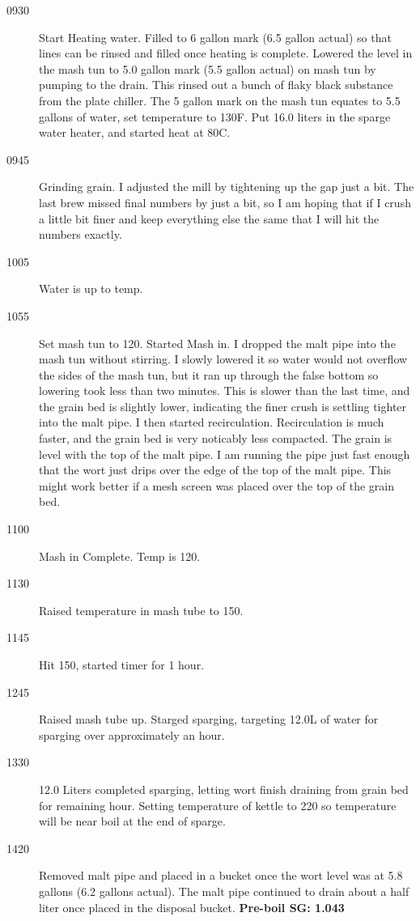 \begin{description}
    \item[0930] Start Heating water.  Filled to 6 gallon mark (6.5 gallon actual) so that lines can be rinsed and filled once heating is complete. Lowered the level in the mash tun to 5.0 gallon mark (5.5 gallon actual) on mash tun by pumping to the drain.  This rinsed out a bunch of flaky black substance from the plate chiller.  The 5 gallon mark on the mash tun equates to 5.5 gallons of water, set temperature to 130F.  Put 16.0 liters in the sparge water heater, and started heat at 80C.  
    \item[0945] Grinding grain.  I adjusted the mill by tightening up the gap just a bit.  The last brew missed final numbers by just a bit, so I am hoping that if I crush a little bit finer and keep everything else the same that I will hit the numbers exactly.
    \item[1005] Water is up to temp.
    \item[1055] Set mash tun to 120. Started Mash in.  I dropped the malt pipe into the mash tun without stirring.  I slowly lowered it so water would not overflow the sides of the mash tun, but it ran up through the false bottom so lowering took less than two minutes.  This is slower than the last time, and the grain bed is slightly lower, indicating the finer crush is settling tighter into the malt pipe.  I then started recirculation.  Recirculation is much faster, and the grain bed is very noticably less compacted.  The grain is level with the top of the malt pipe.  I am running the pipe just fast enough that the wort just drips over the edge of the top of the malt pipe.  This might work better if a mesh screen was placed over the top of the grain bed.
    \item[1100] Mash in Complete. Temp is 120.
    \item[1130] Raised temperature in mash tube to 150.
    \item[1145] Hit 150, started timer for 1 hour.
    \item[1245] Raised mash tube up. Starged sparging, targeting 12.0L of water for sparging over approximately an hour.  
    \item[1330] 12.0 Liters completed sparging, letting wort finish draining from grain bed for remaining hour. Setting temperature of kettle to 220 so temperature will be near boil at the end of sparge.
    \item[1420] Removed malt pipe and placed in a bucket once the wort level was at 5.8 gallons (6.2 gallons actual).  The malt pipe continued to drain about a half liter once placed in the disposal bucket.  \textbf{Pre-boil SG: 1.043}

\end{description}
